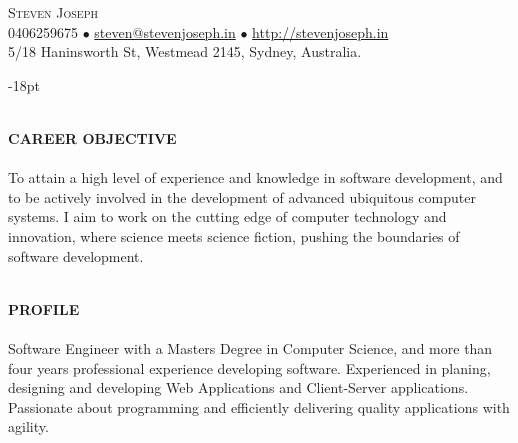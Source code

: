 \documentclass[10pt]{article}
\newcommand{\lineunder}{\vspace*{-10pt} \\ \hspace*{-18pt} \hrulefill \vspace{2pt}\\}
\newcommand{\header}[1]{{\hspace*{-15pt}\vspace*{-0pt}\\ \uppercase{\textbf {#1}}}  \lineunder}
\newcommand{\contact}[4]{
\vspace*{-19pt}
\begin{flushleft}
{\hspace*{-15pt} \Huge \scshape \scshape {#1}}\\
#2\\
#3
\newline
\end{flushleft}
}
\begin{document}

\contact{Steven Joseph}
{0406259675  $\bullet$ \href{mailto:steven@stevenjoseph.in}{steven@stevenjoseph.in} $\bullet$  \href{http://stevenjoseph.in}{http://stevenjoseph.in}}
{5/18 Haninsworth St, Westmead 2145, Sydney, Australia.} 

\vspace{-18pt}


\header{Career Objective}
To attain a high level of experience and knowledge in software development, and to be actively involved in the development of advanced ubiquitous computer systems. 
I aim to work on the cutting edge of computer technology and innovation, where science meets science fiction, pushing the boundaries of software development.

\header{Profile}
Software Engineer with a Masters Degree in Computer Science, and more than four years professional experience developing software.
Experienced in planing, designing and developing Web Applications and Client-Server applications.
Passionate about programming and efficiently delivering quality applications with agility.
\end{document}
